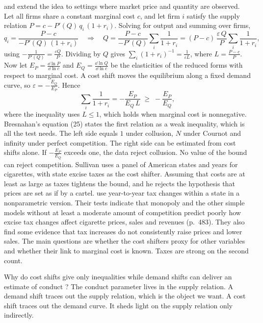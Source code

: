 \citet{Sullivan1985} and \citet{AshenfelterSullivan1987} extend the idea to settings where market price and quantity
are observed. Let all firms share a constant marginal cost $c$, and let firm $i$ satisfy the supply relation
$P = c - P'(Q)\,q_i\,(1 + r_i)$. Solving for output and summing over firms,
\begin{equation*}
q_i = \frac{P - c}{-P'(Q)\,(1 + r_i)}
\quad\Longrightarrow\quad
Q = \frac{P - c}{-P'(Q)}\sum_i \frac{1}{1 + r_i}
  = (P - c)\,\frac{\varepsilon\, Q}{P}\sum_i \frac{1}{1 + r_i},
\end{equation*}
using $-\frac{1}{P'(Q)} = \frac{\varepsilon Q}{P}$. Dividing by $Q$ gives $\sum_i (1 + r_i)^{-1} = \frac{1}{\varepsilon L}$,
where $L = \frac{P - c}{P}$. Now let $E_P = \frac{\dd \ln P}{\dd \ln c}$ and $E_Q = \frac{\dd \ln Q}{\dd \ln c}$ be the
elasticities of the reduced forms with respect to marginal cost. A cost shift moves the equilibrium along a fixed demand
curve, so $\varepsilon = -\frac{E_Q}{E_P}$. Hence
\begin{equation}\label{eq:01-sullivan}
\sum_i \frac{1}{1 + r_i} = -\frac{E_P}{E_Q\, L} \;\ge\; -\frac{E_P}{E_Q} ,
\end{equation}
where the inequality uses $L \le 1$, which holds when marginal cost is nonnegative. Bresnahan's equation (25) states the
first relation as a weak inequality, which is all the test needs. The left side equals $1$ under collusion, $N$ under
Cournot and infinity under perfect competition. The right side can be estimated from cost shifts alone. If
$-\frac{E_P}{E_Q}$ exceeds one, the data reject collusion. No value of the bound can reject competition. Sullivan uses a
panel of American states and years for cigarettes, with state excise taxes as the cost shifter. Assuming that costs are
at least as large as taxes tightens the bound, and he rejects the hypothesis that prices are set as if by a cartel.
\citet{AshenfelterSullivan1987} use year-to-year tax changes within a state in a nonparametric version. Their tests
indicate that monopoly and the other simple models without at least a moderate amount of competition predict
poorly how excise tax changes affect cigarette prices, sales and revenues (p.~483). They also find some evidence
that tax increases do not consistently raise prices and lower sales. The main
questions are whether the cost shifters proxy for other variables and whether their link to marginal cost is known.
Taxes are strong on the second count.

Why do cost shifts give only inequalities while demand shifts can deliver an estimate of conduct
\citep[p.~1039]{Bresnahan1989}? The conduct parameter lives in the supply relation. A demand shift traces out the supply
relation, which is the object we want. A cost shift traces out the demand curve. It sheds light on the supply relation
only indirectly.

